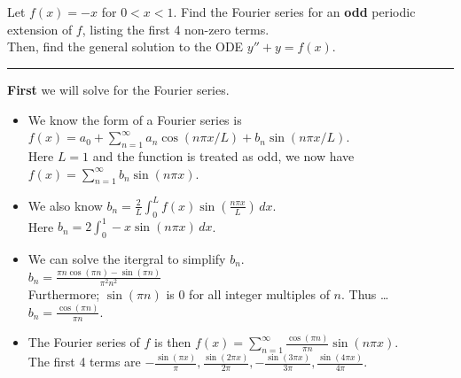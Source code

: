 \documentclass[10pt]{article}
\begin{document}
\newpage


\section{\underline{}}
\label{sec: Problem 2}

\noindent
Let $ f(x) = -x $ for $ 0 < x < 1 $.  
Find the Fourier series for an \textbf{odd} periodic extension of $ f $, 
listing the first 4 non-zero terms. \\
Then, find the general solution to the ODE $ y'' + y = f(x) $. \\
\vspace{2.5mm}

\hrule 

\vspace{7.5mm}

\noindent
\textbf{First} we will solve for the Fourier series. \\

\begin{itemize}
    \item We know the form of a Fourier series is $ \displaystyle f(x) = a_0 + \sum_{n = 1}^{\infty} a_n \cos(n\pi x/L) + b_n \sin (n\pi x/L) $. \\
    \subitem Here $ L = 1 $ and the function is treated as odd, we now have  $ \displaystyle f(x) = \sum_{n = 1}^{\infty} b_n \sin (n\pi x) $. \\
    \item We also know $ \displaystyle b_n = \frac{2}{L} \int_{0}^{L} f(x) \sin(\frac{n\pi x}{L}) \,dx $. \\
    \subitem Here $ \displaystyle b_n = 2 \int_{0}^{1} -x \sin{(n\pi x)} \,dx $. \\
    \item We can solve the itergral to simplify $ b_n $. \\
    \subitem $ \displaystyle b_n = \frac{\pi  n \cos (\pi  n)-\sin (\pi  n)}{\pi ^2 n^2} $ \\
    \subitem Furthermore; $ \displaystyle \sin (\pi  n) $ is 0 for all integer multiples of $ n $. Thus \dots \\
    \subitem $ \displaystyle b_n = \frac{\cos(\pi n)}{\pi n} $. \\
    \item The Fourier series of $ f $ is then $ \displaystyle f(x) = \sum_{n = 1}^{\infty} \frac{\cos(\pi n)}{\pi n} \sin (n\pi x) $. \\
    \subitem The first 4 terms are $ \displaystyle -\frac{\sin (\pi  x)}{\pi },\frac{\sin (2 \pi  x)}{2 \pi },-\frac{\sin (3 \pi  x)}{3 \pi },\frac{\sin (4 \pi  x)}{4 \pi } $. \\
\end{itemize}
\end{document}
